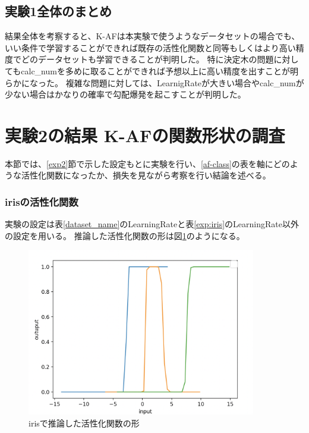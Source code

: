 \subsection{実験1全体のまとめ}
結果全体を考察すると、K-AFは本実験で使うようなデータセットの場合でも、いい条件で学習することができれば既存の活性化関数と同等もしくはより高い精度でどのデータセットも学習できることが判明した。
特に決定木の問題に対してもcalc\_numを多めに取ることができれば予想以上に高い精度を出すことが明らかになった。
複雑な問題に対しては、LearnigRateが大きい場合やcalc\_numが少ない場合はかなりの確率で勾配爆発を起こすことが判明した。


\section{実験2の結果 K-AFの関数形状の調査}
\label{evo2}
本節では、\ref{exp2}節で示した設定もとに実験を行い、\ref{af-class}の表を軸にどのような活性化関数になったか、損失を見ながら考察を行い結論を述べる。





\subsubsection{irisの活性化関数}
\label{evo2:iris_result}
実験の設定は表\ref{dataset_name}のLearningRateと表\ref{exp:iris}のLearningRate以外の設定を用いる。
推論した活性化関数の形は図\ref{infer_iris}のようになる。
\begin{figure}[hbtp]
    \begin{center}
        \includegraphics[width=10cm]{asset/iris-0.1.png}
            \caption{irisで推論した活性化関数の形}
            \label{infer_iris}
    \end{center}
\end{figure}

